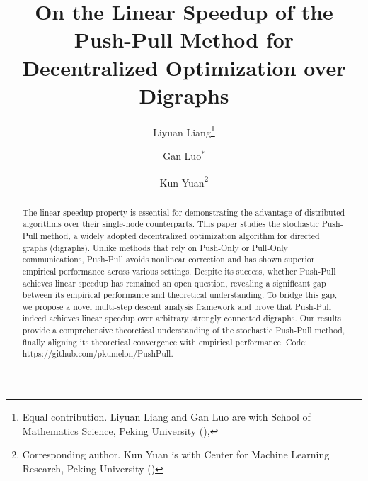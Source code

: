 \documentclass[10pt]{article}
\title{
On the Linear Speedup of the Push-Pull Method for Decentralized Optimization over Digraphs
}
\author{Liyuan Liang\thanks{Equal contribution. Liyuan Liang and Gan Luo are with School of Mathematics Science, Peking University (\email{liangliyuangg@gmail.com, 2200013522@stu.pku.edu.cn}), }
\and Gan Luo{$^*$}
\and Kun Yuan\thanks{Corresponding author. Kun Yuan is with Center for Machine Learning Research, Peking University (\email{kunyuan@pku.edu.cn})}}
\date{}
\newcommand{\pushonly}{{\sc Push-Only}\xspace}
\newcommand{\pushpull}{{\sc Push-Pull}\xspace}
\newcommand{\pullonly}{{\sc Pull-Only}\xspace}
\begin{document}
\maketitle

\begin{abstract}
The linear speedup property is essential for demonstrating the advantage of distributed algorithms over their single-node counterparts. This paper studies the stochastic \pushpull method, a widely adopted decentralized optimization algorithm for directed graphs (digraphs). Unlike methods that rely on \pushonly or \pullonly communications, \pushpull avoids nonlinear correction and has shown superior empirical performance across various settings. Despite its success, whether \pushpull achieves linear speedup has remained an open question, revealing a significant gap between its empirical performance and theoretical understanding. To bridge this gap, we propose a novel multi-step descent analysis framework and prove that \pushpull indeed achieves linear speedup over arbitrary strongly connected digraphs. Our results provide a comprehensive theoretical understanding of the stochastic \pushpull method, finally aligning its theoretical convergence with empirical performance.
Code: \href{https://github.com/pkumelon/PushPull}{https://github.com/pkumelon/PushPull}. 


\end{abstract}
\end{document}
